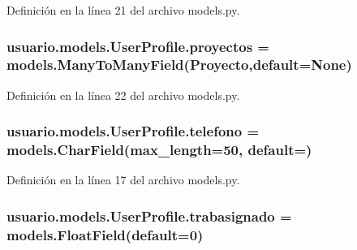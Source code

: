 Definición en la línea 21 del archivo models.\+py.

\subsubsection[{\texorpdfstring{proyectos}{proyectos}}]{\setlength{\rightskip}{0pt plus 5cm}usuario.\+models.\+User\+Profile.\+proyectos = models.\+Many\+To\+Many\+Field({\bf Proyecto},default=None)\hspace{0.3cm}{\ttfamily [static]}}\hypertarget{classusuario_1_1models_1_1_user_profile_a4ff0ba6c2f673bd9a51264d11d805130}{}\label{classusuario_1_1models_1_1_user_profile_a4ff0ba6c2f673bd9a51264d11d805130}


Definición en la línea 22 del archivo models.\+py.

\subsubsection[{\texorpdfstring{telefono}{telefono}}]{\setlength{\rightskip}{0pt plus 5cm}usuario.\+models.\+User\+Profile.\+telefono = models.\+Char\+Field(max\+\_\+length=50, default=\textquotesingle{}\textquotesingle{})\hspace{0.3cm}{\ttfamily [static]}}\hypertarget{classusuario_1_1models_1_1_user_profile_aa2435013de4597d25c50d0942d645b8f}{}\label{classusuario_1_1models_1_1_user_profile_aa2435013de4597d25c50d0942d645b8f}


Definición en la línea 17 del archivo models.\+py.

\subsubsection[{\texorpdfstring{trabasignado}{trabasignado}}]{\setlength{\rightskip}{0pt plus 5cm}usuario.\+models.\+User\+Profile.\+trabasignado = models.\+Float\+Field(default=0)\hspace{0.3cm}{\ttfamily [static]}}\hypertarget{classusuario_1_1models_1_1_user_profile_ae243356225ccd5550d7df50a6acaecd7}{}\label{classusuario_1_1models_1_1_user_profile_ae243356225ccd5550d7df50a6acaecd7}


